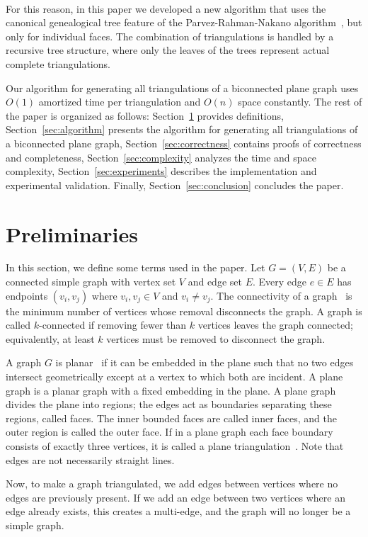 ﻿﻿\documentclass[12pt,a4paper]{article}
\theoremstyle{definition}
\theoremstyle{remark}
\begin{document}
For this reason, in this paper we developed a new algorithm that uses the canonical genealogical tree feature of the Parvez-Rahman-Nakano algorithm~\cite{parvez2011}, but only for individual faces. The combination of triangulations is handled by a recursive tree structure, where only the leaves of the trees represent actual complete triangulations.

Our algorithm for generating all triangulations of a biconnected plane graph uses $O(1)$ amortized time per triangulation and $O(n)$ space constantly.
The rest of the paper is organized as follows: Section~\ref{sec:preliminaries} provides definitions, Section~\ref{sec:algorithm} presents the algorithm for generating all triangulations of a biconnected plane graph, Section~\ref{sec:correctness} contains proofs of correctness and completeness, Section~\ref{sec:complexity} analyzes the time and space complexity, Section~\ref{sec:experiments} describes the implementation and experimental validation. Finally, Section~\ref{sec:conclusion} concludes the paper.


\section{Preliminaries}
\label{sec:preliminaries}
In this section, we define some terms used in the paper.
Let $G = (V, E)$ be a connected simple graph with vertex set $V$ and edge set $E$.
Every edge $e \in E$ has endpoints $(v_i, v_j)$ where $v_i, v_j \in V$ and $v_i \neq v_j$.
The connectivity of a graph~\cite{diestel2017} is the minimum number of vertices whose removal disconnects the graph.
A graph is called $k$-connected if removing fewer than $k$ vertices leaves the graph connected;
equivalently, at least $k$ vertices must be removed to disconnect the graph.


A graph $G$ is planar~\cite{hopcroft1974} if it can be embedded in the plane such that no two edges intersect geometrically except at a vertex to which both are incident. A plane graph is a planar graph with a fixed embedding in the plane. A plane graph divides the plane into regions; the edges act as boundaries separating these regions, called faces. The inner bounded faces are called inner faces, and the outer region is called the outer face. If in a plane graph each face boundary consists of exactly three vertices, it is called a plane triangulation~\cite{chazelle1991}. Note that edges are not necessarily straight lines.

Now, to make a graph triangulated, we add edges between vertices where no edges are previously present. If we add an edge between two vertices where an edge already exists, this creates a multi-edge, and the graph will no longer be a simple graph.
\end{document}
